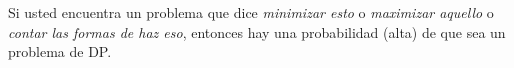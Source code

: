 Si usted encuentra un problema que dice \emph{minimizar esto} o \emph{maximizar aquello} o \emph{contar las formas de haz eso}, entonces hay una probabilidad (alta) de que sea un problema de DP.


